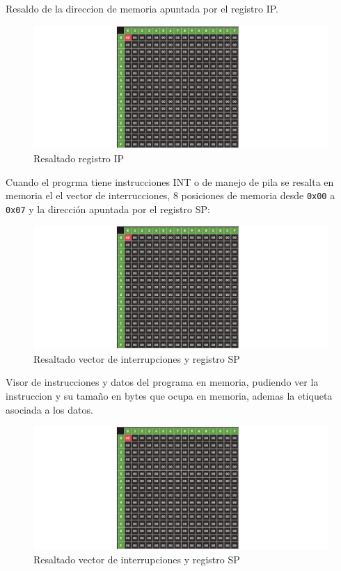 \documentclass[12pt,oneside]{templates/unerthesis}
\begin{document}
Resaldo de la direccion de memoria apuntada por el registro IP.

\begin{figure}

{\centering \includegraphics[width=0.85\linewidth]{images/resaltadoip} 

}

\caption{Resaltado registro IP}\label{fig:resaltadoip}
\end{figure}

Cuando el progrma tiene instrucciones INT o de manejo de pila se resalta en memoria el el vector de interrucciones, 8 posiciones de memoria desde \texttt{0x00} a \texttt{0x07} y la dirección apuntada por el registro SP:

\begin{figure}

{\centering \includegraphics[width=0.85\linewidth]{images/resaltadointsp} 

}

\caption{Resaltado vector de interrupciones y registro SP}\label{fig:resaltadointsp}
\end{figure}

Visor de instrucciones y datos del programa en memoria, pudiendo ver la instruccion y su tamaño en bytes que ocupa en memoria, ademas la etiqueta asociada a los datos.

\begin{figure}

{\centering \includegraphics[width=0.85\linewidth]{images/visorprog} 

}

\caption{Resaltado vector de interrupciones y registro SP}\label{fig:visorprog}
\end{figure}
\end{document}
